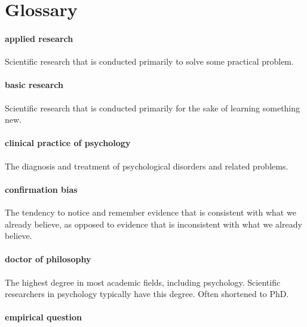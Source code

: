 \documentclass[
]{krantz}
\begin{document}
\section{Glossary}\label{glossary}

\paragraph*{applied research}\label{applied-research}

Scientific research that is conducted primarily to solve some practical problem.

\paragraph*{basic research}\label{basic-research}

Scientific research that is conducted primarily for the sake of learning something new.

\paragraph*{clinical practice of psychology}\label{clinical-practice-of-psychology}

The diagnosis and treatment of psychological disorders and related problems.

\paragraph*{confirmation bias}\label{confirmation-bias}

The tendency to notice and remember evidence that is consistent with what we already believe, as opposed to evidence that is inconsistent with what we already believe.

\paragraph*{doctor of philosophy}\label{doctor-of-philosophy}

The highest degree in most academic fields, including psychology. Scientific researchers in psychology typically have this degree. Often shortened to PhD.

\paragraph*{empirical question}\label{empirical-question}
\end{document}

